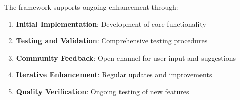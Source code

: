 The framework supports ongoing enhancement through:

\begin{enumerate}
    \item \textbf{Initial Implementation}: Development of core functionality
    \item \textbf{Testing and Validation}: Comprehensive testing procedures
    \item \textbf{Community Feedback}: Open channel for user input and suggestions
    \item \textbf{Iterative Enhancement}: Regular updates and improvements
    \item \textbf{Quality Verification}: Ongoing testing of new features
\end{enumerate}